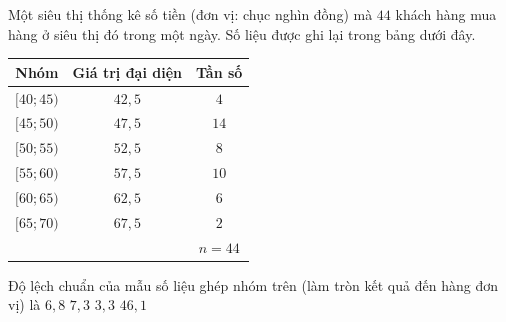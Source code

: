 \begin{ex}%
	Một siêu thị thống kê số tiền (đơn vị: chục nghìn đồng) mà $44$ khách hàng mua  hàng ở siêu thị đó trong một ngày. Số liệu được ghi lại trong bảng dưới đây.
	\begin{longtable}{|c|c|c|}
		 \hline
		Nhóm  & Giá trị đại diện & Tần số\\
		 \hline
		$[40;45)$ & $42{,}5$ & $4$\\ 
		 \hline
		$[45;50)$ &  $47{,}5$ & $14$\\
		 \hline
		 $[50;55)$ & $52{,}5$ & $8$\\
		 \hline
		$[55;60)$ & $57{,}5$ & $10$\\ 
		\hline 
		$[60;65)$ &  $62{,}5$ & $6$\\
		 \hline
		 $[65;70)$ & $67{,}5$ & $2$\\
		\hline 
		&  &$n=44$\\
		\hline 
	\end{longtable}
	Độ lệch chuẩn của mẫu số liệu ghép nhóm trên (làm tròn  kết quả đến hàng đơn vị) là
	\choice 
		{\True $6{,}8$} 
		 {$7{,}3$}
		{$3{,}3$} 
		{$46{,}1$} 
\end{ex}

